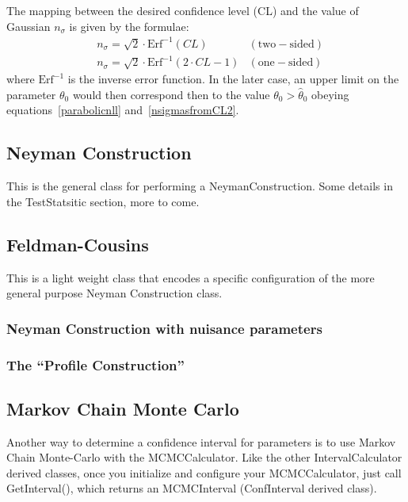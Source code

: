 \documentclass[11pt]{article}
\begin{document}
The mapping between the desired 
confidence level (CL) and the value of Gaussian $n_\sigma$ is given by the formulae:
\begin{eqnarray}
    \label{nsigmasfromCL1}
    &n_\sigma = \sqrt{2}\cdot \mathrm{Erf}^{-1}(CL) & \mathrm{(two-sided)} \\
    &n_\sigma = \sqrt{2}\cdot \mathrm{Erf}^{-1}(2 \cdot CL -1) & \mathrm{(one-sided)}
    \label{nsigmasfromCL2}
\end{eqnarray}
where $\mathrm{Erf}^{-1}$ is the inverse error function. In
the later case, an upper limit on the parameter $\theta_0$ would then
correspond then to the value $\theta_0>\hat{\theta}_0$ obeying
equations~\ref{parabolicnll} and~\ref{nsigmasfromCL2}.



	\subsection{Neyman Construction}

This is the general class for performing a NeymanConstruction.
Some details in the TestStatsitic section, more to come.

	\subsection{Feldman-Cousins}

This is a light weight class that encodes a specific configuration of the more general purpose  Neyman Construction class.


\subsubsection{Neyman Construction with nuisance parameters} 


\subsubsection{The ``Profile Construction''}

\subsection{Markov Chain Monte Carlo}

	Another way to determine a confidence interval for parameters is to use Markov Chain Monte-Carlo with the MCMCCalculator.  Like the other IntervalCalculator derived classes, once you initialize and configure your MCMCCalculator, just call GetInterval(), which returns an MCMCInterval (ConfInterval derived class).
	
\end{document}
